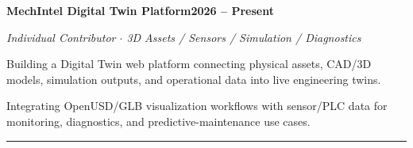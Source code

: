 \documentclass[a4paper,10pt]{article}
\newlength{\sbW}\setlength{\sbW}{63mm}
\newlength{\mnW}\setlength{\mnW}{130mm}
\newcommand{\cventry}[4]{%
  \vspace{2pt}%
  \noindent\begin{minipage}[t]{\mnW}%
    {\color{darktext}\small\bfseries #1}\hfill{\color{accent}\scriptsize\bfseries #3}\par
    {\color{graytext}\footnotesize\itshape #2}\par\vspace{2pt}%
    {\footnotesize\color{bodytext}#4}%
  \end{minipage}\par%
}
\newcommand{\cvbullet}[1]{%
  {\footnotesize\color{bodytext}%
   \hspace{3pt}{\color{accent}\tiny$\blacktriangleright$}\enspace#1\par}%
}
\begin{document}
\begin{minipage}[t]{\dimexpr\textwidth-\sbW\relax}
\begin{minipage}[t]{\mnW}
\cventry{MechIntel Digital Twin Platform}%
  {Individual Contributor \textnormal{$\cdot$} 3D Assets / Sensors / Simulation / Diagnostics}%
  {2026 -- Present}{%
  \cvbullet{Building a Digital Twin web platform connecting physical assets, CAD/3D models, simulation outputs, and operational data into live engineering twins.}
  \cvbullet{Integrating OpenUSD/GLB visualization workflows with sensor/PLC data for monitoring, diagnostics, and predictive-maintenance use cases.}
}
\vspace{8pt}


\vfill
{\color{linecolor!60}\rule{\mnW}{0.4pt}}

\end{minipage}
\end{minipage}
\end{document}
